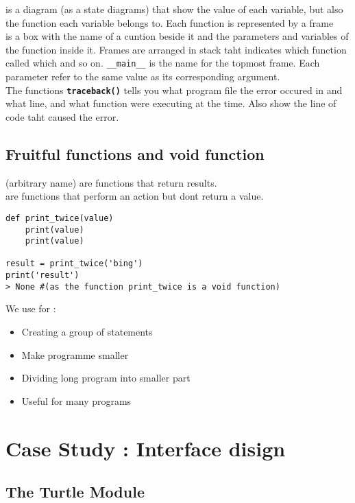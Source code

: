 \documentclass{report}
\begin{document}
 is a diagram (as a state diagrams) that show the value of each variable,
but also the function each variable belongs to. Each function is represented by a frame\\
 is a box with the name of a cuntion beside it and the parameters
and variables of the function inside it. Frames are arranged in stack taht indicates which function
called which and so on. \texttt{\_\_main\_\_} is the name for the topmost frame. Each parameter
refer to the same value as its corresponding argument.\\
The functions \textbf{\texttt{traceback()}} tells you what program file 
the error  occured in and what line, and what function were executing at the time. Also 
show the line of code taht caused the error.

\section{Fruitful functions and void function}
 (arbitrary name) are functions that return results.\\
 are functions that perform an action but dont return a value.

\begin{Example}{}{}
\begin{verbatim}
def print_twice(value)
    print(value)
    print(value)

result = print_twice('bing')
print('result')
> None #(as the function print_twice is a void function)
\end{verbatim}
\end{Example}

We use for :
\begin{itemize}
    \item Creating a group of statements
    \item Make programme smaller
    \item Dividing long program into smaller part
    \item Useful for many programs
\end{itemize}


\chapter{Case Study : Interface disign}

\section{The Turtle Module}
\end{document}
